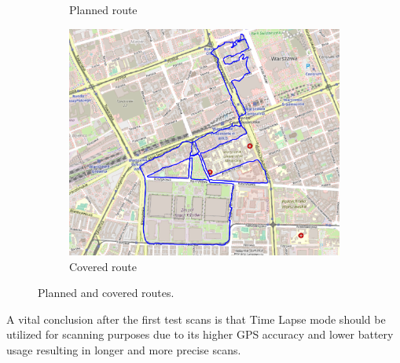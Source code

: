 \documentclass[a4paper,12pt]{article}
\begin{document}
\begin{enumerate}
\begin{figure}[H]
\begin{subfigure}{.88\textwidth}
			\caption{Planned route}
			\label{fig:a1}
		\end{subfigure}%
		\linebreak
		\begin{subfigure}{.88\textwidth}
			\centering
			\includegraphics[width=1\linewidth]{route_c1}
			\caption{Covered route}
			\label{fig:b1}
		\end{subfigure}
		\caption{Planned and covered routes.}
		\label{fig:fig1}
	\end{figure}
\end{enumerate}
A vital conclusion after the first test scans is that Time Lapse mode should be utilized for scanning purposes due to its higher GPS accuracy and lower battery usage resulting in longer and more precise scans.
\end{document}
